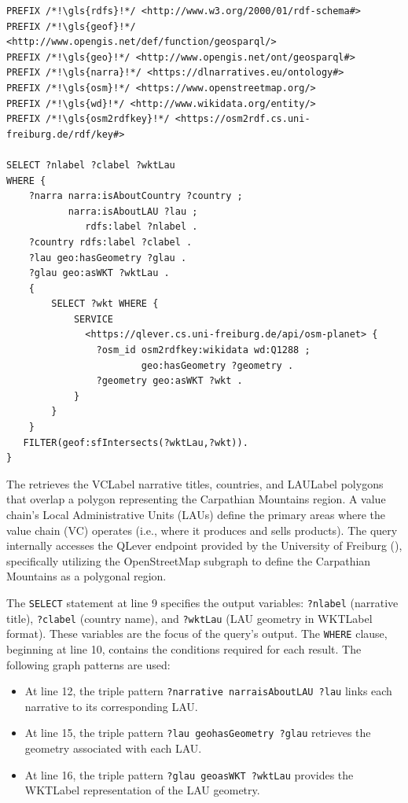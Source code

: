 \begin{lstlisting}[caption=GeoSPARQL Query 1, label={lst:query1}]
PREFIX /*!\gls{rdfs}!*/ <http://www.w3.org/2000/01/rdf-schema#>
PREFIX /*!\gls{geof}!*/ <http://www.opengis.net/def/function/geosparql/> 
PREFIX /*!\gls{geo}!*/ <http://www.opengis.net/ont/geosparql#>
PREFIX /*!\gls{narra}!*/ <https://dlnarratives.eu/ontology#>
PREFIX /*!\gls{osm}!*/ <https://www.openstreetmap.org/>
PREFIX /*!\gls{wd}!*/ <http://www.wikidata.org/entity/>
PREFIX /*!\gls{osm2rdfkey}!*/ <https://osm2rdf.cs.uni-freiburg.de/rdf/key#>

SELECT ?nlabel ?clabel ?wktLau
WHERE {	
    ?narra narra:isAboutCountry ?country ;
           narra:isAboutLAU ?lau ;
    	      rdfs:label ?nlabel .
    ?country rdfs:label ?clabel .
    ?lau geo:hasGeometry ?glau .
    ?glau geo:asWKT ?wktLau . 
    { 
    	SELECT ?wkt WHERE {
        	SERVICE 
      		  <https://qlever.cs.uni-freiburg.de/api/osm-planet> { 
            	?osm_id osm2rdfkey:wikidata wd:Q1288 ;
                        geo:hasGeometry ?geometry .
                ?geometry geo:asWKT ?wkt .
        	} 
    	}
  	}
   FILTER(geof:sfIntersects(?wktLau,?wkt)).
}
\end{lstlisting}


The  retrieves the \acrshort{VCLabel} narrative titles, countries, and \acrshort{LAULabel} polygons that overlap a polygon representing the Carpathian Mountains region. A value chain's Local Administrative Units (LAUs) define the primary areas where the value chain (VC) operates (i.e., where it produces and sells products). The query internally accesses the QLever endpoint provided by the University of Freiburg (), specifically utilizing the OpenStreetMap subgraph to define the Carpathian Mountains as a polygonal region.

The \texttt{SELECT} statement at line 9 specifies the output variables: \texttt{?nlabel} (narrative title), \texttt{?clabel} (country name), and \texttt{?wktLau} (LAU geometry in \acrshort{WKTLabel} format). These variables are the focus of the query’s output. The \texttt{WHERE} clause, beginning at line 10, contains the conditions required for each result. The following graph patterns are used:
\begin{itemize}
    \item At line 12, the triple pattern \texttt{?narrative \gls{narra}isAboutLAU ?lau} links each narrative to its corresponding LAU.
    \item At line 15, the triple pattern \texttt{?lau \gls{geo}hasGeometry ?glau} retrieves the geometry associated with each LAU.
    \item At line 16, the triple pattern \texttt{?glau \gls{geo}asWKT ?wktLau} provides the \acrshort{WKTLabel} representation of the LAU geometry.
\end{itemize}

